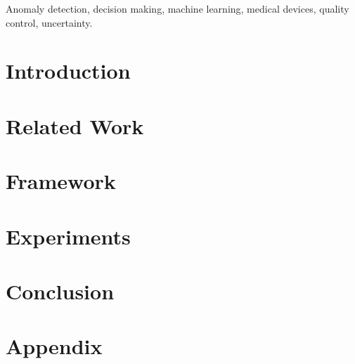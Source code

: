 \documentclass[journal,twoside,web]{ieeecolor2}
\newcommand{\projecttex}{../tex}
\begin{document}
\begin{abstract}
    
\end{abstract}

\begin{IEEEkeywords}
    Anomaly detection, decision making, machine learning, medical devices, quality control, uncertainty.
\end{IEEEkeywords}

\section{Introduction}
\label{sec:introduction}


\section{Related Work}
\label{sec:related-work}


\section{Framework}
\label{sec:framework}


\section{Experiments}
\label{sec:experiments}


\section{Conclusion}
\label{sec:conclusion}





\appendix
\section{Appendix}
\label{sec:appendix}

\end{document}
